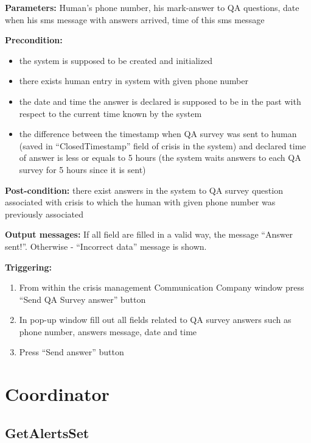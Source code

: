 \begin{description}

\item \textbf{Parameters:} Human's phone number, his mark-answer to QA
questions, date when his sms message with answers arrived, time of this sms
message
\item \textbf{Precondition:}
\begin{itemize}
  \item the system is supposed to be created and initialized
  \item there exists human entry in system with given phone number
  \item the date and time the answer is declared is supposed to be in the past
  with respect to the current time known by the system
  \item the difference between the timestamp when QA survey was sent to human  
  (saved in ``ClosedTimestamp'' field of crisis in the system) and declared
  time of answer is less or equals to 5 hours (the system waits answers to each
  QA survey for 5 hours since it is sent)
\end{itemize}
\item \textbf{Post-condition:} there exist answers in the system to QA survey
question associated with crisis to which the human with given phone number was previously
associated
\item \textbf{Output messages:} If all field are filled in a valid way, the
message ``Answer sent!''. Otherwise - ``Incorrect data'' message is shown.

\item \textbf{Triggering:}
\begin{enumerate}
\item From within the crisis management Communication Company window press
``Send QA Survey answer'' button  
\item In pop-up window fill out all fields related to QA survey answers such as
phone number, answers message, date and time
\item Press ``Send answer'' button
\end{enumerate}

\end{description}

\section{Coordinator}

\subsection{GetAlertsSet}

